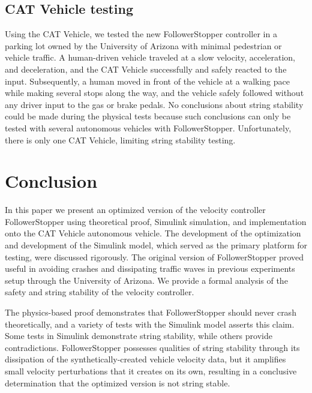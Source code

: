 \documentclass[conference]{IEEEtran}
\begin{document}
\subsection{CAT Vehicle testing}
Using the CAT Vehicle, we tested the new FollowerStopper controller in a parking lot owned by the University of Arizona with minimal pedestrian or vehicle traffic. A human-driven vehicle traveled at a slow velocity, acceleration, and deceleration, and the CAT Vehicle successfully and safely reacted to the input. Subsequently, a human moved in front of the vehicle at a walking pace while making several stops along the way, and the vehicle safely followed without any driver input to the gas or brake pedals. No conclusions about string stability could be made during the physical tests because such conclusions can only be tested with several autonomous vehicles with FollowerStopper. Unfortunately, there is only one CAT Vehicle, limiting string stability testing.






\section{Conclusion}
In this paper we present an optimized version of the velocity controller FollowerStopper using theoretical proof, Simulink simulation, and implementation onto the CAT Vehicle autonomous vehicle. The development of the optimization and development of the Simulink model, which served as the primary platform for testing, were discussed rigorously. The original version of FollowerStopper proved useful in avoiding crashes and dissipating traffic waves in previous experiments setup through the University of Arizona. We provide a formal analysis of the safety and string stability of the velocity controller.

The physics-based proof demonstrates that FollowerStopper should never crash theoretically, and a variety of tests with the Simulink model asserts this claim. Some tests in Simulink demonstrate string stability, while others provide contradictions. FollowerStopper possesses qualities of string stability through its dissipation of the synthetically-created vehicle velocity data, but it amplifies small velocity perturbations that it creates on its own, resulting in a conclusive determination that the optimized version is not string stable.
\end{document}
